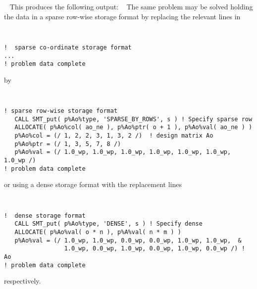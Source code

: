 \documentclass{galahad}
\begin{document}
{\tt \small
\VerbatimInput{\packageexample}
}
\noindent
This produces the following output:
{\tt \small
\VerbatimInput{\packageresults}
}
\noindent
The same problem may be solved holding the data in
a sparse row-wise storage format by replacing the relevant lines in
{\tt \small
\begin{verbatim}
!  sparse co-ordinate storage format
...
! problem data complete
\end{verbatim}
}
\noindent
by
{\tt \small
\begin{verbatim}
! sparse row-wise storage format
   CALL SMT_put( p%Ao%type, 'SPARSE_BY_ROWS', s ) ! Specify sparse row
   ALLOCATE( p%Ao%col( ao_ne ), p%Ao%ptr( o + 1 ), p%Ao%val( ao_ne ) )
   p%Ao%col = (/ 1, 2, 2, 3, 1, 3, 2 /)  ! design matrix Ao
   p%Ao%ptr = (/ 1, 3, 5, 7, 8 /)
   p%Ao%val = (/ 1.0_wp, 1.0_wp, 1.0_wp, 1.0_wp, 1.0_wp, 1.0_wp, 1.0_wp /)
! problem data complete
\end{verbatim}
}
\noindent
or using a dense storage format with the replacement lines
{\tt \small
\begin{verbatim}
!  dense storage format
   CALL SMT_put( p%Ao%type, 'DENSE', s ) ! Specify dense
   ALLOCATE( p%Ao%val( o * n ), p%A%val( n * m ) )
   p%Ao%val = (/ 1.0_wp, 1.0_wp, 0.0_wp, 0.0_wp, 1.0_wp, 1.0_wp,  &
                 1.0_wp, 0.0_wp, 1.0_wp, 0.0_wp, 1.0_wp, 0.0_wp /) ! Ao
! problem data complete
\end{verbatim}
}
\noindent
respectively.
\end{document}
